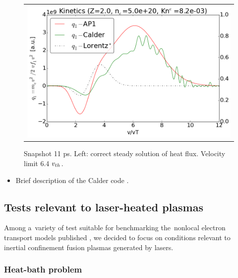 \begin{figure}[tbh]
\begin{center}
\begin{tabular}{c}
	  \includegraphics[width=\figscale\textwidth]{../VFPdata/C7_Calder_case1_nonlocal_kinetics.png}
    \end{tabular}
  \caption{  
  Snapshot 11 ps. Left: correct steady solution of heat flux. 
  Velocity limit 6.4 $v_{th}$.
  }
  \label{fig:C7_Calder_case1}
  \end{center} 
\end{figure}

\begin{itemize}
  \item Brief description of the Calder code .
\end{itemize}

\subsection{Tests relevant to laser-heated plasmas}
\label{sec:SimulationResults}

Among a~variety of test suitable for benchmarking the~nonlocal electron 
transport models published 
\cite{Epperlein_PoFB1991, marocchino2013, Sorbo_2015, 
Sorbo_2016, Sherlock_PoP2017, Brodrick_PoP2017}, we decided to focus on 
conditions relevant to inertial confinement fusion plasmas generated by lasers.

\subsubsection{Heat-bath problem}  
\label{sec:heatbath_test}

